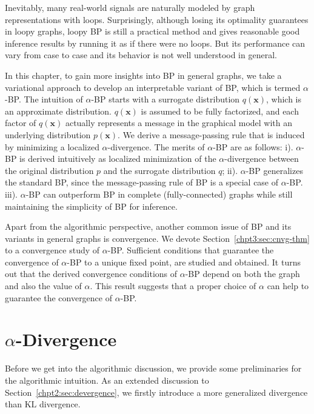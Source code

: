 Inevitably, many real-world signals are naturally modeled by graph representations with loops. Surprisingly, although losing its optimality guarantees in loopy graphs, loopy BP is still a practical method and gives reasonable good inference results by running it as if there were no loops. But its performance can vary from case to case and its behavior is not well understood in general. 

In this chapter, to gain more insights into BP in general graphs, we take a variational approach to develop an interpretable variant of BP, which is termed  $\alpha$-BP.
The intuition of $\alpha$-BP starts with a surrogate distribution $q(\bm{x})$, which is an approximate distribution. $q(\bm{x})$ is assumed to be fully factorized, and each factor of $q(\bm{x})$ actually represents a message in the graphical model with an underlying distribution $p(\bm{x})$. We derive a message-passing rule that is induced by minimizing a localized $\alpha$-divergence. The merits of $\alpha$-BP are as follows: i). {$\alpha$-BP is derived intuitively as localized minimization of the $\alpha$-divergence between the original distribution $p$ and the surrogate distribution $q$}; ii). {$\alpha$-BP generalizes the standard BP, since the message-passing rule of BP is a special case of $\alpha$-BP}. iii). {$\alpha$}-BP can outperform BP in complete (fully-connected) graphs while still maintaining the simplicity of BP for inference.

Apart from the algorithmic perspective, another common issue of BP and its variants in general graphs is convergence. We devote Section~\ref{chpt3:sec:cnvg-thm} to a convergence study of $\alpha$-BP. Sufficient conditions that guarantee the convergence of $\alpha$-BP to a unique fixed point, are studied and obtained. It turns out that the derived convergence conditions of $\alpha$-BP depend on both the graph and also the value of $\alpha$. This result suggests that a proper choice of $\alpha$ can help to guarantee the convergence of $\alpha$-BP.

\section{$\alpha$-Divergence}
\label{chpt3:sec:alpha-divergence}
Before we get into the algorithmic discussion, we provide some preliminaries for the algorithmic intuition. As an extended discussion to Section~\ref{chpt2:sec:devergence}, we firstly introduce a more generalized divergence than $\mathrm{KL}$ divergence.


